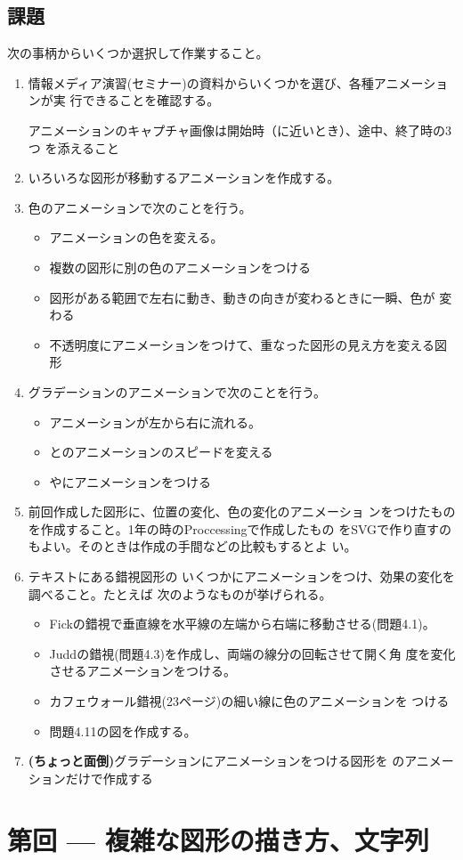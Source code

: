 \documentclass[a4j]{jarticle}
\renewcommand{\Section}[1]{%
\newpage \stepcounter{ReportNo}\section{第\theReportNo 回 --- #1}
}
\begin{document}
\subsection{課題}
次の事柄からいくつか選択して作業すること。
\begin{enumerate}
 \item 情報メディア演習(セミナー)の資料からいくつかを選び、各種アニメーションが実
       行できることを確認する。

アニメーションのキャプチャ画像は開始時（に近いとき）、途中、終了時の3つ
       を添えること
 \item いろいろな図形が移動するアニメーションを作成する。
 \item 色のアニメーションで次のことを行う。
\begin{itemize}
  \item アニメーションの色を変える。
  \item 複数の図形に別の色のアニメーションをつける
   \item 図形がある範囲で左右に動き、動きの向きが変わるときに一瞬、色が
         変わる
 \item 不透明度にアニメーションをつけて、重なった図形の見え方を変える図
       形
\end{itemize}
 \item グラデーションのアニメーションで次のことを行う。
       \begin{itemize}
         \item アニメーションが左から右に流れる。
        \item {}とのアニメーションのスピードを変える
        \item {}やにアニメーションをつける
       \end{itemize}
 \item 前回作成した図形に、位置の変化、色の変化のアニメーショ
       ンをつけたものを作成すること。1年の時のProccessingで作成したもの
       をSVGで作り直すのもよい。そのときは作成の手間などの比較もするとよ
       い。
 \item テキストにある錯視図形の
       いくつかにアニメーションをつけ、効果の変化を調べること。たとえば
       次のようなものが挙げられる。
       \begin{itemize}
        \item Fickの錯視で垂直線を水平線の左端から右端に移動させる(問題4.1)。
        \item Juddの錯視(問題4.3)を作成し、両端の線分の回転させて開く角
							度を変化させるアニメーションをつける。
        \item カフェウォール錯視(23ページ)の細い線に色のアニメーションを
              つける
        \item 問題4.11の図を作成する。
       \end{itemize}
 \item {\bfseries (ちょっと面倒)}グラデーションにアニメーションをつける図形を
       のアニメーションだけで作成する
\end{enumerate}
\Section{複雑な図形の描き方、文字列}
\iffalse
\end{document}

